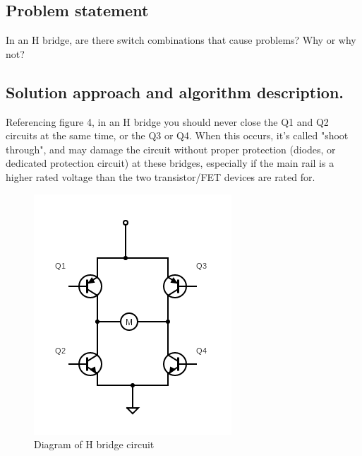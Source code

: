 \documentclass[letterpaper,11pt]{texMemo} %
\begin{document}
\subsection*{Problem statement}
In an H bridge, are there switch combinations that cause problems? Why or why not?

\subsection*{Solution approach and algorithm description.}
Referencing figure 4, in an H bridge you should never close the Q1 and Q2 
circuits at the same time, or the Q3 or Q4. When this occurs, it's called "shoot through",
and may damage the circuit without proper protection (diodes, or dedicated protection circuit) 
at these bridges, especially if the main rail is a higher rated voltage than the  
two transistor/FET devices are rated for.

\begin{figure}[ht]
    \caption{Diagram of H bridge circuit}
    \centering
    \includegraphics[scale=0.45]{img/Hbridge.png}
\end{figure}
\end{document}
